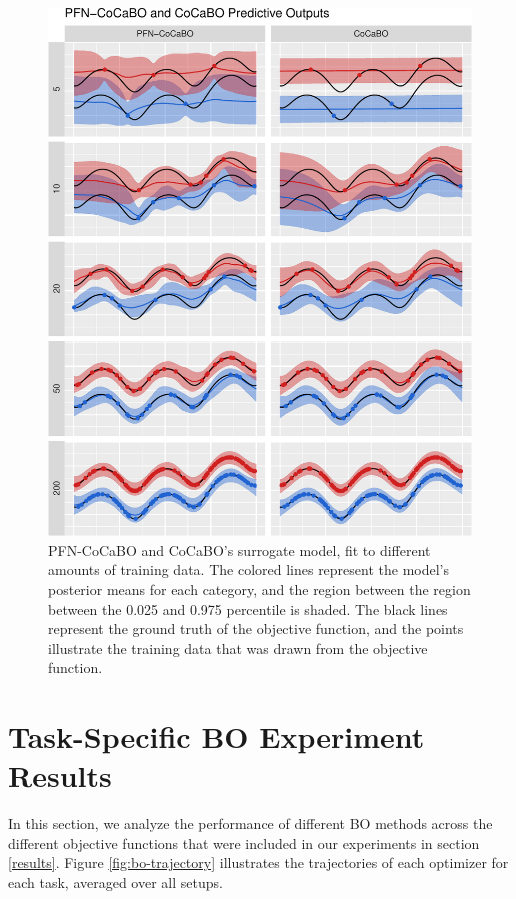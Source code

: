 \documentclass[12pt,twoside]{reedthesis}
\begin{document}
\begin{figure}
\centering
\includegraphics{thesis_files/figure-latex/exampleModelFitCoCaBO-1.pdf}
\caption{\label{fig:exampleModelFitCoCaBO}PFN-CoCaBO and CoCaBO's surrogate model, fit to different amounts of training data. The colored lines represent the model's posterior means for each category, and the region between the region between the 0.025 and 0.975 percentile is shaded. The black lines represent the ground truth of the objective function, and the points illustrate the training data that was drawn from the objective function.}
\end{figure}
\hypertarget{appendixBOrank}{%
\chapter{Task-Specific BO Experiment Results}\label{appendixBOrank}}

In this section, we analyze the performance of different BO methods across the different objective functions that were included in our experiments in section \ref{results}. Figure \ref{fig:bo-trajectory} illustrates the trajectories of each optimizer for each task, averaged over all setups.
\end{document}
